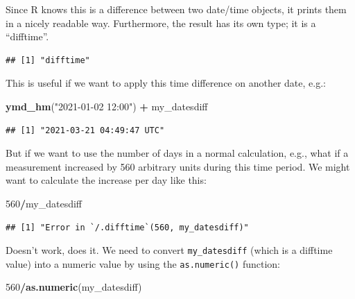 \documentclass[
  12pt,
  krantz2]{krantz}
\makeatletter
\newenvironment{Shaded}{\begin{snugshade}}{\end{snugshade}}
\newcommand{\DecValTok}[1]{\textcolor[rgb]{0.00,0.00,0.81}{#1}}
\newcommand{\KeywordTok}[1]{\textcolor[rgb]{0.13,0.29,0.53}{\textbf{#1}}}
\newcommand{\NormalTok}[1]{#1}
\newcommand{\OperatorTok}[1]{\textcolor[rgb]{0.81,0.36,0.00}{\textbf{#1}}}
\newcommand{\StringTok}[1]{\textcolor[rgb]{0.31,0.60,0.02}{#1}}
\newenvironment{kframe}{%
\medskip{}
\setlength{\fboxsep}{.8em}
 \def\at@end@of@kframe{}%
 \ifinner\ifhmode%
  \def\at@end@of@kframe{\end{minipage}}%
  \begin{minipage}{\columnwidth}%
 \fi\fi%
 \def\FrameCommand##1{\hskip\@totalleftmargin \hskip-\fboxsep
 \colorbox{shadecolor}{##1}\hskip-\fboxsep
     \hskip-\linewidth \hskip-\@totalleftmargin \hskip\columnwidth}%
 \MakeFramed {\advance\hsize-\width
   \@totalleftmargin\z@ \linewidth\hsize
   \@setminipage}}%
 {\par\unskip\endMakeFramed%
 \at@end@of@kframe}
\renewenvironment{Shaded}{\begin{kframe}}{\end{kframe}}
\makeatother
\begin{document}
Since R knows this is a difference between two date/time objects, it prints them in a nicely readable way.
Furthermore, the result has its own type; it is a ``difftime''.

\begin{Shaded}
\end{Shaded}

\begin{verbatim}
## [1] "difftime"
\end{verbatim}

This is useful if we want to apply this time difference on another date, e.g.:

\begin{Shaded}
\begin{Highlighting}[]
\KeywordTok{ymd_hm}\NormalTok{(}\StringTok{"2021-01-02 12:00"}\NormalTok{) }\OperatorTok{+}\StringTok{ }\NormalTok{my_datesdiff}
\end{Highlighting}
\end{Shaded}

\begin{verbatim}
## [1] "2021-03-21 04:49:47 UTC"
\end{verbatim}

But if we want to use the number of days in a normal calculation, e.g., what if a measurement increased by 560 arbitrary units during this time period.
We might want to calculate the increase per day like this:

\begin{Shaded}
\begin{Highlighting}[]
\DecValTok{560}\OperatorTok{/}\NormalTok{my_datesdiff}
\end{Highlighting}
\end{Shaded}

\begin{verbatim}
## [1] "Error in `/.difftime`(560, my_datesdiff)"
\end{verbatim}

Doesn't work, does it.
We need to convert \texttt{my\_datesdiff} (which is a difftime value) into a numeric value by using the \texttt{as.numeric()} function:

\begin{Shaded}
\begin{Highlighting}[]
\DecValTok{560}\OperatorTok{/}\KeywordTok{as.numeric}\NormalTok{(my_datesdiff)}
\end{Highlighting}
\end{Shaded}
\end{document}
